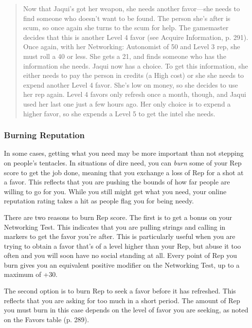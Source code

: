 \begin{quotation} Now that Jaqui’s got her weapon, she needs another favor—she needs to find someone who doesn’t want to be found. The person she’s after is scum, so once again she turns to the scum for help. The gamemaster decides that this is another Level 4 favor (see Acquire Information, p. 291). Once again, with her Networking: Autonomist of 50 and Level 3 rep, she must roll a 40 or less. She gets a 21, and finds someone who has the information she needs. Jaqui now has a choice. To get this information, she either needs to pay the person in credits (a High cost) or she she needs to expend another Level 4 favor. She’s low on money, so she decides to use her rep again. Level 4 favors only refresh once a month, though, and Jaqui used her last one just a few hours ago. Her only choice is to expend a higher favor, so she expends a Level 5 to get the intel she needs. \end{quotation} 



\subsubsection{Burning Reputation} 

In some cases, getting what you need may be more important than not stepping on people's tentacles. In situations of dire need, you can \textit{burn }some of your Rep score to get the job done, meaning that you exchange a loss of Rep for a shot at a favor. This reflects that you are pushing the bounds of how far people are willing to go for you. While you still might get what you need, your online reputation rating takes a hit as people flag you for being needy. 

There are two reasons to burn Rep score. The first is to get a bonus on your Networking Test. This indicates that you are pulling strings and calling in markers to get the favor you're after. This is particularly useful when you are trying to obtain a favor that's of a level higher than your Rep, but abuse it too often and you will soon have no social standing at all. Every point of Rep you burn gives you an equivalent positive modifier on the Networking Test, up to a maximum of +30. 

The second option is to burn Rep to seek a favor before it has refreshed. This reflects that you are asking for too much in a short period. The amount of Rep you must burn in this case depends on the level of favor you are seeking, as noted on the Favors table (p. 289). 

